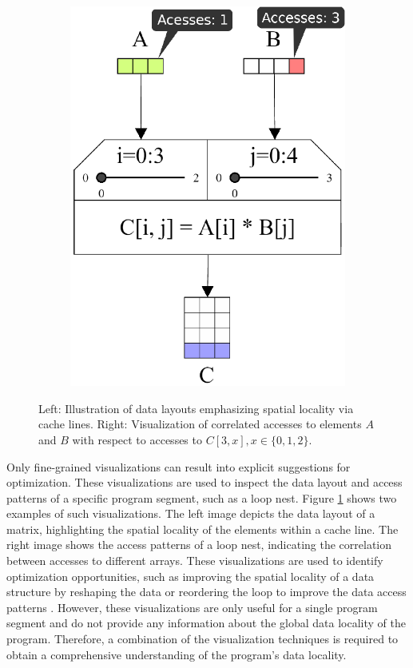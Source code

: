 \begin{figure}
\begin{subfigure}[c]{.44\linewidth}
		\includegraphics[width=\linewidth]{pictures/boosting_access_patterns.png}
	\end{subfigure}
	\caption{Left: Illustration of data layouts emphasizing spatial locality via cache lines. Right: Visualization of correlated accesses to elements $A$ and $B$ with respect to accesses to $C[3,x], x \in \{0,1,2\}$. \cite{schaad2022boosting}}
	\label{fig:boosting_cache}
\end{figure}

Only fine-grained visualizations can result into explicit suggestions for optimization. These visualizations are used to inspect the data layout and access patterns of a specific program segment, such as a loop nest. Figure \ref{fig:boosting_cache} shows two examples of such visualizations. The left image depicts the data layout of a matrix, highlighting the spatial locality of the elements within a cache line. The right image shows the access patterns of a loop nest, indicating the correlation between accesses to different arrays. These visualizations are used to identify optimization opportunities, such as improving the spatial locality of a data structure by reshaping the data or reordering the loop to improve the data access patterns \cite{schaad2022boosting}. However, these visualizations are only useful for a single program segment and do not provide any information about the global data locality of the program. Therefore, a combination of the visualization techniques is required to obtain a comprehensive understanding of the program's data locality.
